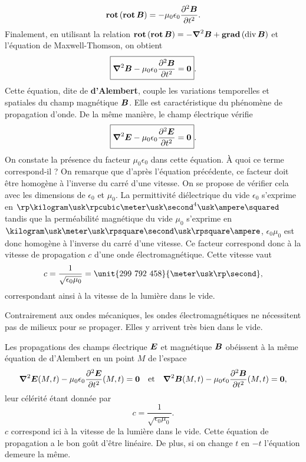 \begin{equation*}
	\rot(\rot \vecb) = -\mu_0 \epsilon_0 \dd{^2\vecb}{t^2}.
\end{equation*}
Finalement, en utilisant la relation $\rot(\rot \vecb) = - \laplacien \vecb 
+ \gradient(\div \vecb)$ et l'équation de Maxwell-Thomson, on obtient
\begin{equation*}
	\boxed{\laplacien \vecb - \mu_0 \epsilon_0 \dd{^2\vecb}{t^2} = \mathbf{0}}.
\end{equation*}
Cette équation, dite de \textbf{d'Alembert}, couple les variations temporelles
et spatiales du champ magnétique $\vecb$. Elle est caractéristique du phénomène
de propagation d'onde. De la même manière, le champ électrique vérifie
\begin{equation*}
	\boxed{\laplacien \vece - \mu_0 \epsilon_0 \dd{^2\vece}{t^2} = \mathbf{0}}.
\end{equation*}
On constate la présence du facteur $\mu_0 \epsilon_0$ dans cette équation. 
À quoi ce terme correspond-il ? On remarque que d'après l'équation précédente, ce 
facteur doit être homogène à l'inverse du carré d'une vitesse. 
On se propose de vérifier cela avec les dimensions de $\epsilon_0$ 
et $\mu_0$. La permittivité diélectrique du vide $\epsilon_0$ s'exprime en 
$\rp \kilogram \usk \rpcubic \meter \usk \second^4 \usk \ampere \squared$ 
tandis que la perméabilité magnétique du vide $\mu_0$ s'exprime en 
$\kilogram \usk \meter \usk \rpsquare \second \usk \rpsquare \ampere$, 
$\epsilon_0 \mu_0$ est donc homogène à l'inverse du carré d'une vitesse. Ce facteur
correspond donc à la vitesse de propagation $c$ d'une onde électromagnétique. 
Cette vitesse vaut
\begin{equation*}
	c = \dfrac{1}{\sqrt{\epsilon_0 \mu_0}} = \unit{299\ 792\ 458}{\meter 
	\usk \rp \second},
\end{equation*}
correspondant ainsi à la vitesse de la lumière dans le vide.

\begin{rema}
	Contrairement aux ondes mécaniques, les ondes électromagnétiques ne
	nécessitent pas de milieux pour se propager. Elles y arrivent très bien
	dans le vide.
\end{rema}

\begin{defn}
	Les propagations des champs électrique $\vece$ et magnétique $\vecb$ obéissent 
	à la même équation de d'Alembert en un point $M$ de l'espace
	\begin{equation}
	\laplacien \vece(M, t) - \mu_0 \epsilon_0 \dd{^2\vece}{t^2}(M, t) = \mathbf{0}
	\quad \mathrm{et} \quad
	\laplacien \vecb(M, t) - \mu_0 \epsilon_0 \dd{^2\vecb}{t^2}(M, t) = \mathbf{0},
	\end{equation}
	leur célérité étant donnée par 
	\begin{equation*}
		c = \dfrac{1}{\sqrt{\epsilon_0 \mu_0}}.
	\end{equation*}
	$c$ correspond ici à la vitesse de la lumière dans le vide. Cette équation
	de propagation a le bon goût d'être linéaire. De plus, si on change $t$
	en $-t$ l'équation demeure la même.
\end{defn}

